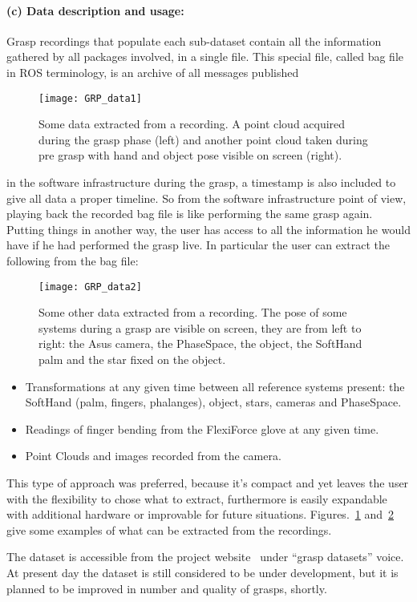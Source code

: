 \paragraph{(c) Data description and usage:}
Grasp recordings that populate each sub-dataset contain all the information gathered by all packages involved, in a single file. This special file, called bag file in ROS terminology, is an archive of all messages published
\begin{figure}[tb!]
  \centering
  \texttt{[image: GRP\_data1]}
  \caption{Some data extracted from a recording. A point cloud acquired during the grasp phase (left) and another point cloud taken during pre grasp with hand and object pose visible on screen (right).}
  \label{fig:grasp:data1}
\end{figure}
in the software infrastructure during the grasp, a timestamp is also included to give all data a proper timeline. So from the software infrastructure point of view, playing back the recorded bag file is like performing the
same grasp again. Putting things in another way, the user has access to all the information he would have if he had performed the grasp live. In particular the user can extract the following from the bag file:
\begin{figure}[tb!]
  \centering
  \texttt{[image: GRP\_data2]}
  \caption{Some other data extracted from a recording. The pose of some systems during a grasp are visible on screen, they are from left to right: the Asus camera, the PhaseSpace, the object, the SoftHand palm and the star fixed on the object.}
  \label{fig:grasp:data2}
\end{figure}
\begin{itemize}
  \item Transformations at any given time between all reference systems present: the SoftHand (palm, fingers, phalanges), object, stars, cameras and PhaseSpace.
  \item Readings of finger bending from the FlexiForce glove at any given time.
  \item Point Clouds and images recorded from the camera.
\end{itemize}
This type of approach was preferred, because it's compact and yet leaves the user with the flexibility to chose what to extract, furthermore is easily expandable with additional hardware or improvable for future situations.
Figures.~\ref{fig:grasp:data1} and~\ref{fig:grasp:data2} give some examples of what can be extracted from the recordings.

The dataset is accessible from the project website~\cite{website:pacman:dataset} under ``grasp datasets'' voice. At present day the dataset is still considered to be under development, but it is planned to be improved in number 
and quality of grasps, shortly.

